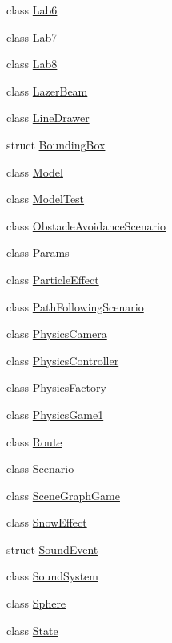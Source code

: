 \begin{DoxyCompactItemize}
\item 
class \hyperlink{class_b_g_e_1_1_lab6}{Lab6}
\item 
class \hyperlink{class_b_g_e_1_1_lab7}{Lab7}
\item 
class \hyperlink{class_b_g_e_1_1_lab8}{Lab8}
\item 
class \hyperlink{class_b_g_e_1_1_lazer_beam}{Lazer\-Beam}
\item 
class \hyperlink{class_b_g_e_1_1_line_drawer}{Line\-Drawer}
\item 
struct \hyperlink{struct_b_g_e_1_1_bounding_box}{Bounding\-Box}
\item 
class \hyperlink{class_b_g_e_1_1_model}{Model}
\item 
class \hyperlink{class_b_g_e_1_1_model_test}{Model\-Test}
\item 
class \hyperlink{class_b_g_e_1_1_obstacle_avoidance_scenario}{Obstacle\-Avoidance\-Scenario}
\item 
class \hyperlink{class_b_g_e_1_1_params}{Params}
\item 
class \hyperlink{class_b_g_e_1_1_particle_effect}{Particle\-Effect}
\item 
class \hyperlink{class_b_g_e_1_1_path_following_scenario}{Path\-Following\-Scenario}
\item 
class \hyperlink{class_b_g_e_1_1_physics_camera}{Physics\-Camera}
\item 
class \hyperlink{class_b_g_e_1_1_physics_controller}{Physics\-Controller}
\item 
class \hyperlink{class_b_g_e_1_1_physics_factory}{Physics\-Factory}
\item 
class \hyperlink{class_b_g_e_1_1_physics_game1}{Physics\-Game1}
\item 
class \hyperlink{class_b_g_e_1_1_route}{Route}
\item 
class \hyperlink{class_b_g_e_1_1_scenario}{Scenario}
\item 
class \hyperlink{class_b_g_e_1_1_scene_graph_game}{Scene\-Graph\-Game}
\item 
class \hyperlink{class_b_g_e_1_1_snow_effect}{Snow\-Effect}
\item 
struct \hyperlink{struct_b_g_e_1_1_sound_event}{Sound\-Event}
\item 
class \hyperlink{class_b_g_e_1_1_sound_system}{Sound\-System}
\item 
class \hyperlink{class_b_g_e_1_1_sphere}{Sphere}
\item 
class \hyperlink{class_b_g_e_1_1_state}{State}
\item 

\end{DoxyCompactItemize}
